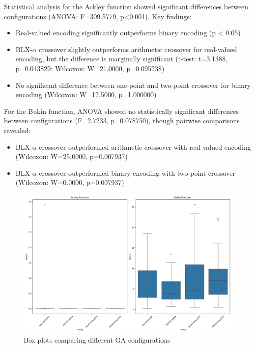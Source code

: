 \documentclass{article}
\begin{document}
Statistical analysis for the Ackley function showed significant differences between configurations (ANOVA: F=309.5779, p<0.001). Key findings:

\begin{itemize}
\item Real-valued encoding significantly outperforms binary encoding (p < 0.05)
\item BLX-$\alpha$ crossover slightly outperforms arithmetic crossover for real-valued encoding, but the difference is marginally significant (t-test: t=3.1388, p=0.013829; Wilcoxon: W=21.0000, p=0.095238)
\item No significant difference between one-point and two-point crossover for binary encoding (Wilcoxon: W=12.5000, p=1.000000)
\end{itemize}

For the Bukin function, ANOVA showed no statistically significant differences between configurations (F=2.7233, p=0.078750), though pairwise comparisons revealed:

\begin{itemize}
\item BLX-$\alpha$ crossover outperformed arithmetic crossover with real-valued encoding (Wilcoxon: W=25.0000, p=0.007937)
\item BLX-$\alpha$ crossover outperformed binary encoding with two-point crossover (Wilcoxon: W=0.0000, p=0.007937)
\end{itemize}

\begin{figure}[H]
\centering
\includegraphics[width=\textwidth]{ga_comparison_boxplot.png}
\caption{Box plots comparing different GA configurations}
\label{fig:boxplot}
\end{figure}
\end{document}
